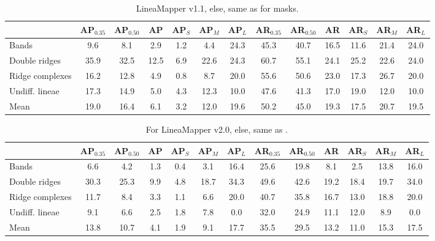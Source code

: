 \begin{table*}%
\centering
\caption{LineaMapper v1.1, else, same as  for masks.}
\label{tab:segm_metrics_v1.1_112x112}
\begin{tabular}{@{}lcccccc|cccccc@{}}
\toprule
 & AP$_{0.35}$ & AP$_{0.50}$ & AP & AP$_S$ & AP$_M$ & AP$_L$ & AR$_{0.35}$ & AR$_{0.50}$ & AR & AR$_S$ & AR$_M$ & AR$_L$ \\ \midrule
Bands & 9.6 & 8.1 & 2.9 & 1.2 & 4.4 & 24.3 & 45.3 & 40.7 & 16.5 & 11.6 & 21.4 & 24.0 \\
Double ridges & 35.9 & 32.5 & 12.5 & 6.9 & 22.6 & 24.3 & 60.7 & 55.1 & 24.1 & 25.2 & 22.6 & 24.0 \\
Ridge complexes & 16.2 & 12.8 & 4.9 & 0.8 & 8.7 & 20.0 & 55.6 & 50.6 & 23.0 & 17.3 & 26.7 & 20.0 \\
Undiff. lineae & 17.3 & 14.9 & 5.0 & 4.3 & 12.3 & 10.0 & 47.6 & 41.3 & 17.0 & 19.0 & 12.0 & 10.0 \\ \midrule
Mean & 19.0 & 16.4 & 6.1 & 3.2 & 12.0 & 19.6 & 50.2 & 45.0 & 19.3 & 17.5 & 20.7 & 19.5 \\ \bottomrule
\end{tabular}
\end{table*}


\begin{table*}%
\centering
\caption{For LineaMapper v2.0, else, same as .}
\label{tab:segm_metrics_v2.0_112x112}
\begin{tabular}{@{}lcccccc|cccccc@{}}
\toprule
 & AP$_{0.35}$ & AP$_{0.50}$ & AP & AP$_S$ & AP$_M$ & AP$_L$ & AR$_{0.35}$ & AR$_{0.50}$ & AR & AR$_S$ & AR$_M$ & AR$_L$ \\ \midrule
Bands & 6.6 & 4.2 & 1.3 & 0.4 & 3.1 & 16.4 & 25.6 & 19.8 & 8.1 & 2.5 & 13.8 & 16.0 \\
Double ridges & 30.3 & 25.3 & 9.9 & 4.8 & 18.7 & 34.3 & 49.6 & 42.6 & 19.2 & 18.4 & 19.7 & 34.0 \\
Ridge complexes & 11.7 & 8.4 & 3.3 & 1.1 & 6.6 & 20.0 & 40.7 & 35.8 & 16.7 & 13.0 & 18.8 & 20.0 \\
Undiff. lineae & 9.1 & 6.6 & 2.5 & 1.8 & 7.8 & 0.0 & 32.0 & 24.9 & 11.1 & 12.0 & 8.9 & 0.0 \\ \midrule
Mean & 13.8 & 10.7 & 4.1 & 1.9 & 9.1 & 17.7 & 35.5 & 29.5 & 13.2 & 11.0 & 15.3 & 17.5 \\ \bottomrule
\end{tabular}
\end{table*}


